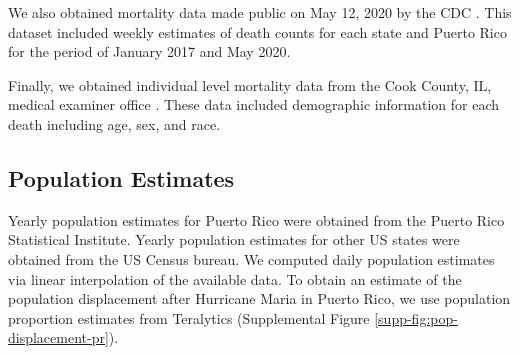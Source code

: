 \documentclass[11pt]{article}
\begin{document}
We also obtained mortality data made public on May 12, 2020 by the CDC  \cite{cdc2020covid19}. This dataset included weekly estimates of death counts for each state and Puerto Rico for the period of January 2017 and May 2020. 

Finally, we obtained individual level mortality data from the Cook County, IL, medical examiner office \cite{cookcovid19}. These data included demographic information for each death including age, sex, and race.

\subsection{Population Estimates}
\label{subsec:population}
Yearly population estimates for Puerto Rico were obtained from the Puerto Rico Statistical Institute. Yearly population estimates for other US states were obtained from the US Census bureau. We computed daily population estimates via linear interpolation of the available data. To obtain an estimate of the population displacement after Hurricane Maria in Puerto Rico, we use population proportion estimates from Teralytics (Supplemental Figure \ref{supp-fig:pop-displacement-pr}).
\end{document}
